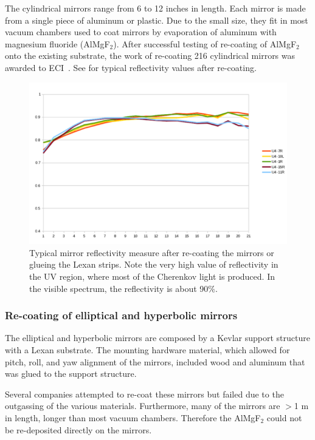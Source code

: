 The cylindrical mirrors range from 6 to 12 inches in length. Each mirror is made from a single piece of aluminum or plastic.
Due to the small size, they fit in most vacuum chambers used to coat mirrors by evaporation of aluminum with magnesium fluoride
(AlMgF$_2$). After successful testing of re-coating of AlMgF$_2$ onto the existing substrate, the work of re-coating 216 cylindrical mirrors
was awarded to ECI~\cite{ECI}. See  for typical reflectivity values after re-coating.

\begin{figure}[h]
	\centering
	\includegraphics[width=0.95\columnwidth,keepaspectratio]{img/mirrorsReflectivityAfter.png}
	\caption{Typical mirror reflectivity measure after re-coating the mirrors or glueing the Lexan strips. Note the very high value of reflectivity
		     in the UV region, where most of the Cherenkov light is produced. In the visible spectrum, the reflectivity is about 90$\%$.}
	\label{fig:reflectivityAfter}
\end{figure}

\subsubsection{Re-coating of elliptical and hyperbolic mirrors}

The elliptical and hyperbolic mirrors are composed by a Kevlar support structure with a Lexan substrate. The mounting hardware
material, which allowed for pitch, roll, and yaw alignment of the mirrors, included wood and aluminum that was glued to the support structure.

Several companies attempted to re-coat these mirrors but failed due to the outgassing of the various materials. Furthermore, many of the mirrors
are $>$1 m in length, longer than most vacuum chambers. Therefore the AlMgF$_2$ could not be re-deposited directly on the mirrors.

